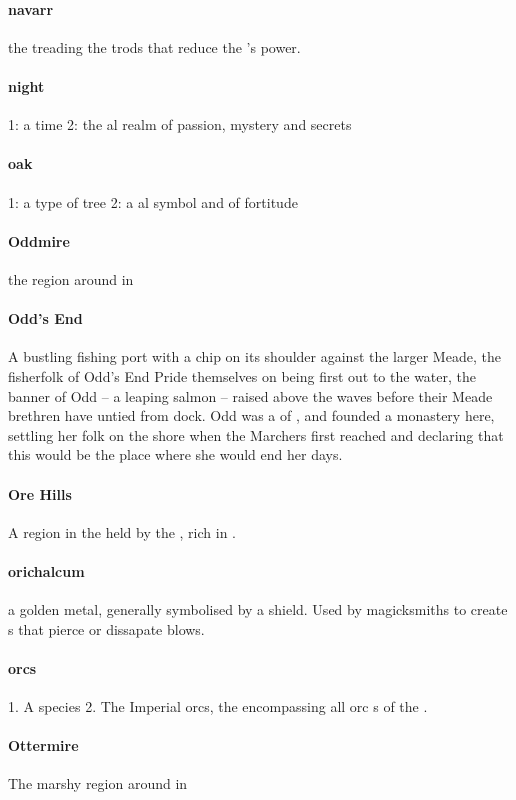 \paragraph{navarr} the  treading the trods that reduce the 's power.
\paragraph{night} 1: a time 2: the al realm of passion, mystery and secrets
\paragraph{oak} 1: a type of tree 2: a al symbol and  of fortitude
\paragraph{Oddmire} the region around  in 
\paragraph{Odd's End} A bustling fishing port with a chip on its shoulder against the larger Meade, the fisherfolk of Odd's End Pride themselves on being first out to the water, the banner of Odd – a leaping salmon – raised above the waves before their Meade brethren have untied from dock. Odd was a  of , and founded a monastery here, settling her folk on the shore when the Marchers first reached  and declaring that this would be the place where she would end her days. 
\paragraph{Ore Hills} A region in the  held by the , rich in .
\paragraph{orichalcum} a golden metal, generally symbolised by a shield. Used by magicksmiths to create s that pierce or dissapate blows.
\paragraph{orcs} 1. A species 2. The Imperial orcs, the  encompassing all orc s of the .
\paragraph{Ottermire} The marshy region around  in 
